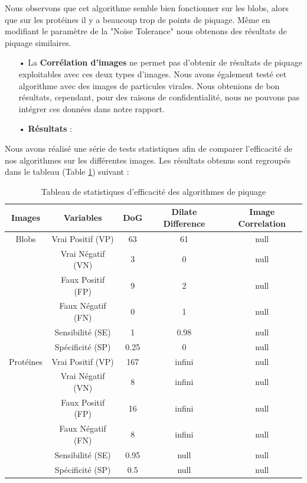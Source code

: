 Nous observons que cet algorithme semble bien fonctionner sur les blobs, alors que sur les protéines il y a beaucoup trop de points de piquage. Même en modifiant le paramètre de la "Noise Tolerance" nous obtenons des résultats de piquage similaires. \\

\begin{itemize}
\item[•] La \textbf{Corrélation d'images} ne permet pas d'obtenir de résultats de piquage exploitables avec ces deux types d'images. Nous avons également testé cet algorithme avec des images de particules virales. Nous obtenions de bon résultats, cependant, pour des raisons de confidentialité, nous ne pouvons pas intégrer ces données dans notre rapport. \\
\end{itemize}

\begin{itemize}
\item[•] \textbf{Résultats} :
\end{itemize}

Nous avons réalisé une série de tests statistiques afin de comparer l'efficacité de nos algorithmes sur les différentes images. Les résultats obtenus sont regroupés dans le tableau (Table \ref{tableau}) suivant :

\begin{table}[h]
\begin{center}
\begin{tabular}{|c|c|c|c|c|}
\hline
\textbf{Images} & \textbf{Variables} & \textbf{DoG} & \textbf{Dilate Difference} & \textbf{Image Correlation} \\
\hline
Blobs & Vrai Positif (VP) & 63 & 61 & null \\
	& Vrai Négatif (VN) & 3 & 0 & null \\
	& Faux Positif (FP) & 9 & 2 & null \\
	& Faux Négatif (FN) & 0 & 1 & null \\
	& Sensibilité (SE) & 1 & 0.98 & null \\
	& Spécificité (SP) & 0.25 & 0 & null \\
\hline
Protéines & Vrai Positif (VP) & 167 & infini & null \\
	& Vrai Négatif (VN) & 8 & infini & null \\
	& Faux Positif (FP) & 16 & infini & null \\
	& Faux Négatif (FN) & 8 & infini & null \\
	& Sensibilité (SE) & 0.95 & null & null \\
	& Spécificité (SP) & 0.5 & null & null \\
	\hline
\end{tabular}
\end{center}
\caption{Tableau de statistiques d'efficacité des algorithmes de piquage}
\label{tableau}
\end{table}

